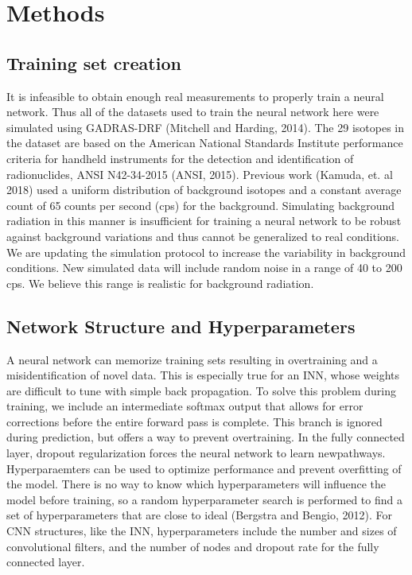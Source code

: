 \documentclass[11pt]{article}
\begin{document}
\section{Methods}
\subsection{Training set creation}
It is infeasible to obtain enough real measurements to properly train a neural network. 
Thus all of the datasets used to train the neural network here were simulated using GADRAS-DRF (Mitchell and Harding, 2014). 
The 29 isotopes in the dataset are based on the American National Standards Institute performance criteria for handheld instruments for the detection and identification of radionuclides, ANSI N42-34-2015 (ANSI, 2015). 
Previous work (Kamuda, et. al 2018) used a uniform distribution of background isotopes and a constant average count of 65 counts per second (cps) for the background. 
Simulating background radiation in this manner is insufficient for training a neural network to be robust against background variations and thus cannot be generalized to real conditions. 
We are updating the simulation protocol to increase the variability in background conditions. New simulated data will include random noise in a range of 40 to 200 cps. 
We believe this range is realistic for background radiation.
\subsection{Network Structure and Hyperparameters}
A neural network can memorize training sets resulting in overtraining and a misidentification of novel data. 
This is especially true for an INN, whose weights are difficult to tune with simple back propagation.
To solve this problem during training, we include an intermediate softmax output that allows for error corrections before the entire forward pass is complete. 
This branch is ignored during prediction, but offers a way to prevent overtraining. 
In the fully connected layer, dropout regularization forces the neural network to learn newpathways. 
Hyperparaemters can be used to optimize performance and prevent overfitting of the model.
There is no way to know which hyperparameters will influence the model before training, so a random hyperparameter search is performed to find a set of hyperparameters that are close to ideal (Bergstra and Bengio, 2012). 
For CNN structures, like the INN, hyperparameters include the number and sizes of convolutional filters, and the number of nodes and dropout rate for the fully connected layer. 
\end{document}

